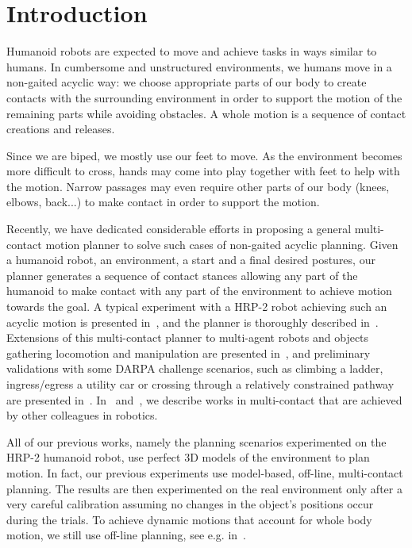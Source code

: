 \section{Introduction}

Humanoid robots are expected to move and achieve tasks in ways similar to humans. In cumbersome and unstructured environments, we humans move in a non-gaited acyclic way: we choose appropriate parts of our body to create contacts with the surrounding environment in order to support the motion of the remaining parts while avoiding obstacles. A whole motion is a sequence of contact creations and releases. 

Since we are biped, we mostly use our feet to move. As the environment becomes more difficult to cross, hands may come into play together with feet to help with the motion. Narrow passages may even require other parts of our body (knees, elbows, back...) to make contact in order to support the motion. 

Recently, we have dedicated considerable efforts in proposing a general multi-contact motion planner to solve such cases of non-gaited acyclic planning. Given a humanoid robot, an environment, a start and a final desired postures, our planner generates a sequence of contact stances allowing any part of the humanoid to make contact with any part of the environment to achieve motion towards the goal. A typical experiment with a HRP-2 robot achieving such an acyclic motion is presented in~\cite{escande:iser:2008}, and the planner is thoroughly described in~\cite{escande:ras:2013}. Extensions of this multi-contact planner to multi-agent robots and objects gathering locomotion and manipulation are presented in~\cite{bouyarmane:ar:2012}, and preliminary validations with some DARPA challenge scenarios, such as climbing a ladder, ingress/egress a utility car or crossing through a relatively constrained pathway are presented in~\cite{bouyarmane:humanoids:2012}. In~\cite{escande:ras:2013} and~\cite{bouyarmane:ar:2012}, we describe works in multi-contact that are achieved by other colleagues in robotics.  

All of our previous works, namely the planning scenarios experimented on the HRP-2 humanoid robot, use perfect 3D models of the environment to plan motion. In fact, our previous experiments use model-based, off-line, multi-contact planning. The results are then experimented on the real environment only after a very careful calibration assuming no changes in the object's positions occur during the trials. To achieve dynamic motions that account for whole body motion, we still use off-line planning, see e.g. in~\cite{lengagne:ijrr:2013}. 

